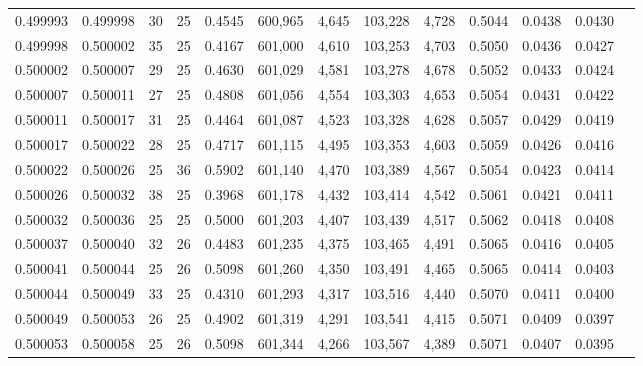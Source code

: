 \begin{tabular}{rrrrrrrrrrrrr}
0.499993 & 0.499998 &    30 &  25 &                                     0.4545 & 600,965 &   4,645 & 103,228 &   4,728 & 0.5044 & 0.0438 & 0.0430 \\
0.499998 & 0.500002 &    35 &  25 &                                     0.4167 & 601,000 &   4,610 & 103,253 &   4,703 & 0.5050 & 0.0436 & 0.0427 \\
0.500002 & 0.500007 &    29 &  25 &                                     0.4630 & 601,029 &   4,581 & 103,278 &   4,678 & 0.5052 & 0.0433 & 0.0424 \\
0.500007 & 0.500011 &    27 &  25 &                                     0.4808 & 601,056 &   4,554 & 103,303 &   4,653 & 0.5054 & 0.0431 & 0.0422 \\
0.500011 & 0.500017 &    31 &  25 &                                     0.4464 & 601,087 &   4,523 & 103,328 &   4,628 & 0.5057 & 0.0429 & 0.0419 \\
0.500017 & 0.500022 &    28 &  25 &                                     0.4717 & 601,115 &   4,495 & 103,353 &   4,603 & 0.5059 & 0.0426 & 0.0416 \\
0.500022 & 0.500026 &    25 &  36 &                                     0.5902 & 601,140 &   4,470 & 103,389 &   4,567 & 0.5054 & 0.0423 & 0.0414 \\
0.500026 & 0.500032 &    38 &  25 &                                     0.3968 & 601,178 &   4,432 & 103,414 &   4,542 & 0.5061 & 0.0421 & 0.0411 \\
0.500032 & 0.500036 &    25 &  25 &                                     0.5000 & 601,203 &   4,407 & 103,439 &   4,517 & 0.5062 & 0.0418 & 0.0408 \\
0.500037 & 0.500040 &    32 &  26 &                                     0.4483 & 601,235 &   4,375 & 103,465 &   4,491 & 0.5065 & 0.0416 & 0.0405 \\
0.500041 & 0.500044 &    25 &  26 &                                     0.5098 & 601,260 &   4,350 & 103,491 &   4,465 & 0.5065 & 0.0414 & 0.0403 \\
0.500044 & 0.500049 &    33 &  25 &                                     0.4310 & 601,293 &   4,317 & 103,516 &   4,440 & 0.5070 & 0.0411 & 0.0400 \\
0.500049 & 0.500053 &    26 &  25 &                                     0.4902 & 601,319 &   4,291 & 103,541 &   4,415 & 0.5071 & 0.0409 & 0.0397 \\
0.500053 & 0.500058 &    25 &  26 &                                     0.5098 & 601,344 &   4,266 & 103,567 &   4,389 & 0.5071 & 0.0407 & 0.0395 \\

\end{tabular}
